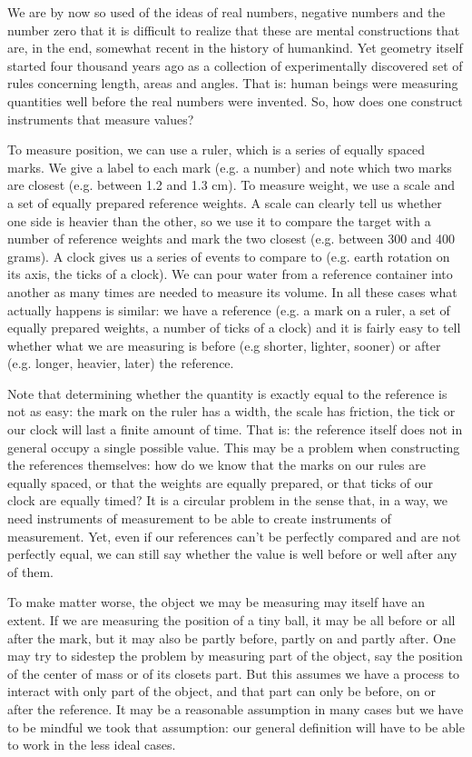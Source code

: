 \documentclass[11pt,letterpaper,fleqn]{memoir} %
\begin{document}
We are by now so used of the ideas of real numbers, negative numbers and the number zero that it is difficult to realize that these are mental constructions that are, in the end, somewhat recent in the history of humankind. Yet geometry itself started four thousand years ago as a collection of experimentally discovered set of rules concerning length, areas and angles. That is: human beings were measuring quantities well before the real numbers were invented. So, how does one construct instruments that measure values?

To measure position, we can use a ruler, which is a series of equally spaced marks. We give a label to each mark (e.g. a number) and note which two marks are closest (e.g. between 1.2 and 1.3 cm). To measure weight, we use a scale and a set of equally prepared reference weights. A scale can clearly tell us whether one side is heavier than the other, so we use it to compare the target with a number of reference weights and mark the two closest (e.g. between 300 and 400 grams). A clock gives us a series of events to compare to (e.g. earth rotation on its axis, the ticks of a clock). We can pour water from a reference container into another as many times are needed to measure its volume. In all these cases what actually happens is similar: we have a reference (e.g. a mark on a ruler, a set of equally prepared weights, a number of ticks of a clock) and it is fairly easy to tell whether what we are measuring is before (e.g shorter, lighter, sooner) or after (e.g. longer, heavier, later) the reference.

Note that determining whether the quantity is exactly equal to the reference is not as easy: the mark on the ruler has a width, the scale has friction, the tick or our clock will last a finite amount of time. That is: the reference itself does not in general occupy a single possible value. This may be a problem when constructing the references themselves: how do we know that the marks on our rules are equally spaced, or that the weights are equally prepared, or that ticks of our clock are equally timed? It is a circular problem in the sense that, in a way, we need instruments of measurement to be able to create instruments of measurement. Yet, even if our references can't be perfectly compared and are not perfectly equal, we can still say whether the value is well before or well after any of them.

To make matter worse, the object we may be measuring may itself have an extent. If we are measuring the position of a tiny ball, it may be all before or all after the mark, but it may also be partly before, partly on and partly after. One may try to sidestep the problem by measuring part of the object, say the position of the center of mass or of its closets part. But this assumes we have a process to interact with only part of the object, and that part can only be before, on or after the reference. It may be a reasonable assumption in many cases but we have to be mindful we took that assumption: our general definition will have to be able to work in the less ideal cases.
\end{document}
